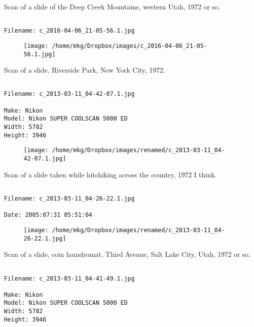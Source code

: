 \clearpage
\onecolumn
\noindent Scan of a slide of the Deep Creek Mountains, western Utah, 1972 or so.
\noindent
\begin{lstlisting}

Filename: c_2016-04-06_21-05-56.1.jpg

\end{lstlisting}
\clearpage

\begin{figure}
\texttt{[image: /home/mkg/Dropbox/images/c\_2016-04-06\_21-05-56.1.jpg]}
\end{figure}
    
\clearpage
\onecolumn
\noindent Scan of a slide, Riverside Park, New York City, 1972.
\noindent
\begin{lstlisting}

Filename: c_2013-03-11_04-42-07.1.jpg

Make: Nikon
Model: Nikon SUPER COOLSCAN 5000 ED
Width: 5782
Height: 3946
\end{lstlisting}
\clearpage

\begin{figure}
\texttt{[image: /home/mkg/Dropbox/images/renamed/c\_2013-03-11\_04-42-07.1.jpg]}
\end{figure}
    
\clearpage
\onecolumn
\noindent Scan of a slide taken while hitchiking across the country, 1972 I think.
\noindent
\begin{lstlisting}

Filename: c_2013-03-11_04-26-22.1.jpg

Date: 2005:07:31 05:51:04
\end{lstlisting}
\clearpage

\begin{figure}
\texttt{[image: /home/mkg/Dropbox/images/renamed/c\_2013-03-11\_04-26-22.1.jpg]}
\end{figure}
    
\clearpage
\onecolumn
\noindent Scan of a slide, coin laundromat, Third Avenue, Salt Lake City, Utah, 1972 or so.
\noindent
\begin{lstlisting}

Filename: c_2013-03-11_04-41-49.1.jpg

Make: Nikon
Model: Nikon SUPER COOLSCAN 5000 ED
Width: 5782
Height: 3946
\end{lstlisting}
\clearpage

